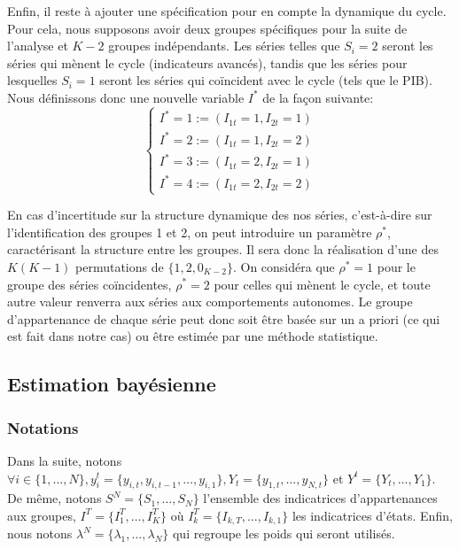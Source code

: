 \documentclass[10pt,french,french]{article}
\begin{document}
Enfin, il reste à ajouter une spécification pour en compte la dynamique du cycle.
Pour cela, nous supposons avoir deux groupes spécifiques pour la suite de l'analyse et \(K-2\) groupes indépendants.
Les séries telles que \(S_i = 2\) seront les séries qui mènent le cycle (indicateurs avancés), tandis que les séries pour lesquelles \(S_i = 1\) seront les séries qui coïncident avec le cycle (tels que le PIB).
Nous définissons donc une nouvelle variable \(I^*\) de la façon suivante: \[\begin{cases}
I^* = 1 := (I_{1t}=1,I_{2t}=1) \\
I^* = 2 := (I_{1t}=1,I_{2t}=2) \\
I^* = 3 := (I_{1t}=2,I_{2t}=1) \\
I^* = 4 := (I_{1t}=2,I_{2t}=2) 
\end{cases}\]

En cas d'incertitude sur la structure dynamique des nos séries, c'est-à-dire sur l'identification des groupes 1 et 2, on peut introduire un paramètre \(\rho^*\), caractérisant la structure entre les groupes.
Il sera donc la réalisation d'une des \(K(K-1)\) permutations de \(\{1,2,0_{K-2}\}\).
On considéra que \(\rho^*=1\) pour le groupe des séries coïncidentes, \(\rho^*=2\) pour celles qui mènent le cycle, et toute autre valeur renverra aux séries aux comportements autonomes.
Le groupe d'appartenance de chaque série peut donc soit être basée sur un a priori (ce qui est fait dans notre cas) ou être estimée par une méthode statistique.

\hypertarget{estimation-bayuxe9sienne}{%
\subsection{Estimation bayésienne}\label{estimation-bayuxe9sienne}}

\hypertarget{notations}{%
\subsubsection{Notations}\label{notations}}

Dans la suite, notons \(\forall i \in \{1,\dots,N\}, y_i^t = \{y_{i,t},y_{i,t-1},\dots,y_{i,1}\}, Y_t = \{y_{1,t}, \dots, y_{N,t} \} \text{ et } Y^t = \{Y_t, \dots, Y_1\}\).
De même, notons \(S^N = \{S_1, \dots, S_N\}\) l'ensemble des indicatrices d'appartenances aux groupes, \(I^T = \{I_1^T, \dots, I_K^T\}\) où \(I_k^T=\{I_{k,T}, \dots, I_{k,1}\}\) les indicatrices d'états.
Enfin, nous notons \(\lambda^N = \{\lambda_1, \dots, \lambda_N\}\) qui regroupe les poids qui seront utilisés.
\end{document}
